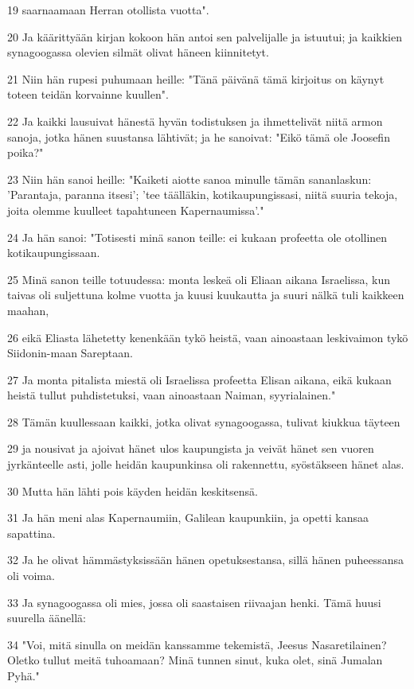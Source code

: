 \par 19 saarnaamaan Herran otollista vuotta".
\par 20 Ja käärittyään kirjan kokoon hän antoi sen palvelijalle ja istuutui; ja kaikkien synagoogassa olevien silmät olivat häneen kiinnitetyt.
\par 21 Niin hän rupesi puhumaan heille: "Tänä päivänä tämä kirjoitus on käynyt toteen teidän korvainne kuullen".
\par 22 Ja kaikki lausuivat hänestä hyvän todistuksen ja ihmettelivät niitä armon sanoja, jotka hänen suustansa lähtivät; ja he sanoivat: "Eikö tämä ole Joosefin poika?"
\par 23 Niin hän sanoi heille: "Kaiketi aiotte sanoa minulle tämän sananlaskun: 'Parantaja, paranna itsesi'; 'tee täälläkin, kotikaupungissasi, niitä suuria tekoja, joita olemme kuulleet tapahtuneen Kapernaumissa'."
\par 24 Ja hän sanoi: "Totisesti minä sanon teille: ei kukaan profeetta ole otollinen kotikaupungissaan.
\par 25 Minä sanon teille totuudessa: monta leskeä oli Eliaan aikana Israelissa, kun taivas oli suljettuna kolme vuotta ja kuusi kuukautta ja suuri nälkä tuli kaikkeen maahan,
\par 26 eikä Eliasta lähetetty kenenkään tykö heistä, vaan ainoastaan leskivaimon tykö Siidonin-maan Sareptaan.
\par 27 Ja monta pitalista miestä oli Israelissa profeetta Elisan aikana, eikä kukaan heistä tullut puhdistetuksi, vaan ainoastaan Naiman, syyrialainen."
\par 28 Tämän kuullessaan kaikki, jotka olivat synagoogassa, tulivat kiukkua täyteen
\par 29 ja nousivat ja ajoivat hänet ulos kaupungista ja veivät hänet sen vuoren jyrkänteelle asti, jolle heidän kaupunkinsa oli rakennettu, syöstäkseen hänet alas.
\par 30 Mutta hän lähti pois käyden heidän keskitsensä.
\par 31 Ja hän meni alas Kapernaumiin, Galilean kaupunkiin, ja opetti kansaa sapattina.
\par 32 Ja he olivat hämmästyksissään hänen opetuksestansa, sillä hänen puheessansa oli voima.
\par 33 Ja synagoogassa oli mies, jossa oli saastaisen riivaajan henki. Tämä huusi suurella äänellä:
\par 34 "Voi, mitä sinulla on meidän kanssamme tekemistä, Jeesus Nasaretilainen? Oletko tullut meitä tuhoamaan? Minä tunnen sinut, kuka olet, sinä Jumalan Pyhä."
